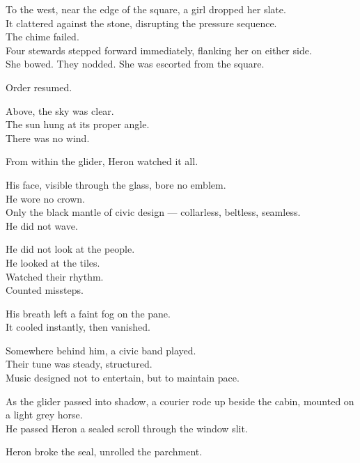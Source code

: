 \documentclass[9pt]{article}
\begin{document}
\vspace{1em}

To the west, near the edge of the square, a girl dropped her slate.\\
It clattered against the stone, disrupting the pressure sequence.\\
The chime failed.\\
Four stewards stepped forward immediately, flanking her on either side.\\
She bowed. They nodded. She was escorted from the square.

Order resumed.

\vspace{1em}

Above, the sky was clear.\\
The sun hung at its proper angle.\\
There was no wind.

\vspace{1em}

From within the glider, Heron watched it all.

His face, visible through the glass, bore no emblem.\\
He wore no crown.\\
Only the black mantle of civic design — collarless, beltless, seamless.\\
He did not wave.

He did not look at the people.\\
He looked at the tiles.\\
Watched their rhythm.\\
Counted missteps.

His breath left a faint fog on the pane.\\
It cooled instantly, then vanished.

\vspace{1em}

Somewhere behind him, a civic band played.\\
Their tune was steady, structured.\\
Music designed not to entertain, but to maintain pace.

\vspace{1em}

As the glider passed into shadow, a courier rode up beside the cabin, mounted on a light grey horse.\\
He passed Heron a sealed scroll through the window slit.

Heron broke the seal, unrolled the parchment.
\end{document}
